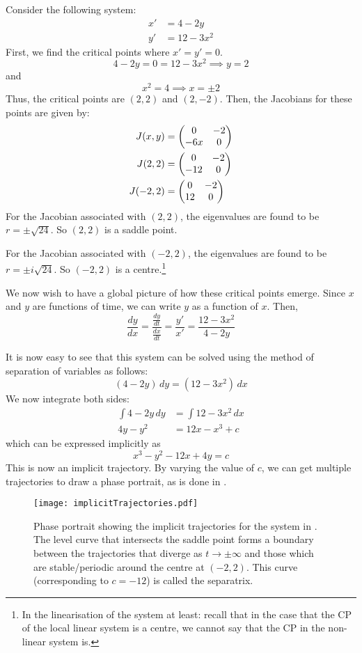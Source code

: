 \begin{eg}\label{eg:imptraj}
	Consider the following system:
	\begin{align*}
		x' &= 4 - 2y \\
		y' &= 12 - 3x^2
	\end{align*}
	First, we find the critical points where $x' = y' = 0$.
	\[
	4-2y = 0 = 12-3x^2 \implies y = 2 
	\] 
	and 
	\[
	x^2 = 4 \implies x = \pm 2
	\]
	Thus, the critical points are $(2,2)$ and $(2,-2)$.
	Then, the Jacobians for these points are given by:
	\begin{align*}
		J(x, y) &= \begin{pmatrix}0 & -2 \\ -6x & 0\end{pmatrix} \\
		J(2, 2) &= \begin{pmatrix}0 & -2 \\ -12 & 0\end{pmatrix} \\
		J(-2, 2) &= \begin{pmatrix}0 & -2 \\ 12 & 0\end{pmatrix} 
	\end{align*}
	For the Jacobian associated with $(2,2)$, the eigenvalues are found to be $r = \pm \sqrt{24}$. So $(2,2)$ is a saddle point.
	
	For the Jacobian associated with $(-2,2)$, the eigenvalues are found to be $r = \pm i\sqrt{24}$. So $(-2,2)$ is a centre.\footnote{In the linearisation of the system at least: recall that in the case that the CP of the local linear system is a centre, we cannot say that the CP in the non-linear system is.}
	
	We now wish to have a global picture of how these critical points emerge. Since $x$ and $y$ are functions of time, we can write $y$ as a function of $x$. Then, 
	\[
	\frac{dy}{dx} = \frac{\frac{dy}{dt}}{\frac{dx}{dt}} = \frac{y'}{x'} = \frac{12-3x^2}{4-2y}
	\]
	
	It is now easy to see that this system can be solved using the method of separation of variables as follows:
	\[
	(4-2y)\,dy = (12 - 3x^2)\,dx
	\]
	We now integrate both sides:
	\begin{align*}
		\int 4-2y\,dy &= \int 12 - 3x^2\,dx \\
		4y - y^2 &= 12x - x^3 + c
	\end{align*}
	which can be expressed implicitly as
	\[
	x^3 - y^2 - 12x + 4y = c
	\]
	This is now an implicit trajectory. By varying the value of $c$, we can get multiple trajectories to draw a phase portrait, as is done in .
\end{eg}

\begin{figure}[!ht]
	\centering
	\texttt{[image: implicitTrajectories.pdf]}
	\caption{Phase portrait showing the implicit trajectories for the system in . The level curve that intersects the saddle point forms a boundary between the trajectories that diverge as $t \to \pm \infty$ and those which are stable/periodic around the centre at $(-2,2)$. This curve (corresponding to $c=-12$) is called the separatrix.}
	\label{fig:implicittraj}
\end{figure}


